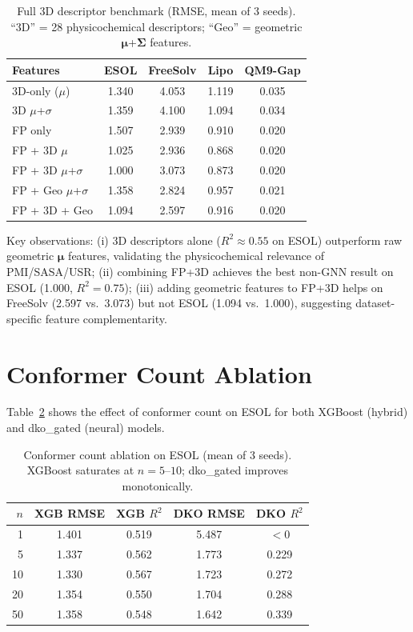 \documentclass[sigconf]{acmart}
\begin{document}
\begin{table}[ht]
\caption{Full 3D descriptor benchmark (RMSE, mean of 3 seeds). ``3D'' = 28 physicochemical descriptors; ``Geo'' = geometric $\boldsymbol{\mu}$+$\boldsymbol{\Sigma}$ features.}
\label{tab:3d_full}
\centering
\small
\begin{tabular}{@{}lcccc@{}}
\toprule
Features & ESOL & FreeSolv & Lipo & QM9-Gap \\
\midrule
3D-only ($\mu$)     & 1.340 & 4.053 & 1.119 & 0.035 \\
3D $\mu$+$\sigma$   & 1.359 & 4.100 & 1.094 & 0.034 \\
FP only              & 1.507 & 2.939 & 0.910 & 0.020 \\
FP + 3D $\mu$        & 1.025 & 2.936 & 0.868 & 0.020 \\
FP + 3D $\mu$+$\sigma$ & 1.000 & 3.073 & 0.873 & 0.020 \\
FP + Geo $\mu$+$\sigma$ & 1.358 & 2.824 & 0.957 & 0.021 \\
FP + 3D + Geo        & 1.094 & 2.597 & 0.916 & 0.020 \\
\bottomrule
\end{tabular}
\end{table}

Key observations: (i) 3D descriptors alone ($R^2 \approx 0.55$ on ESOL) outperform raw geometric $\boldsymbol{\mu}$ features, validating the physicochemical relevance of PMI/SASA/USR; (ii) combining FP+3D achieves the best non-GNN result on ESOL (1.000, $R^2 = 0.75$); (iii) adding geometric features to FP+3D helps on FreeSolv (2.597 vs.\ 3.073) but not ESOL (1.094 vs.\ 1.000), suggesting dataset-specific feature complementarity.

\section{Conformer Count Ablation}
\label{app:conf_abl}

Table~\ref{tab:conf_abl} shows the effect of conformer count on ESOL for both XGBoost (hybrid) and dko\_gated (neural) models.

\begin{table}[ht]
\caption{Conformer count ablation on ESOL (mean of 3 seeds). XGBoost saturates at $n{=}5$--$10$; dko\_gated improves monotonically.}
\label{tab:conf_abl}
\centering
\small
\begin{tabular}{@{}rcccc@{}}
\toprule
$n$ & XGB RMSE & XGB $R^2$ & DKO RMSE & DKO $R^2$ \\
\midrule
1   & 1.401 & 0.519 & 5.487 & $<$0 \\
5   & 1.337 & 0.562 & 1.773 & 0.229 \\
10  & 1.330 & 0.567 & 1.723 & 0.272 \\
20  & 1.354 & 0.550 & 1.704 & 0.288 \\
50  & 1.358 & 0.548 & 1.642 & 0.339 \\
\bottomrule
\end{tabular}
\end{table}
\end{document}
